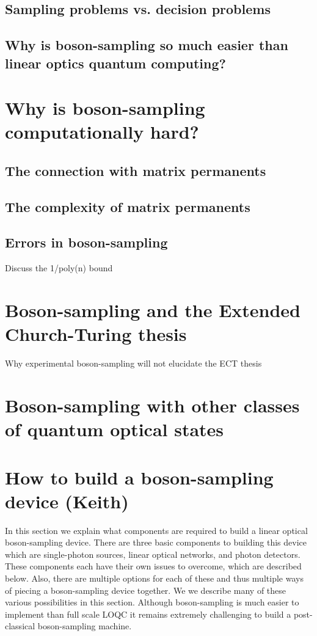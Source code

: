 \documentclass[aps,pra,twocolumn,amsmath,amssymb,nofootinbib,superscriptaddress]{revtex4}
\begin{document}
\subsection{Sampling problems vs. decision problems}

\subsection{Why is boson-sampling so much easier than linear optics quantum computing?}

\section{Why is boson-sampling computationally hard?}

\subsection{The connection with matrix permanents}

\subsection{The complexity of matrix permanents}

\subsection{Errors in boson-sampling}
Discuss the 1/poly(n) bound

\section{Boson-sampling and the Extended Church-Turing thesis}
Why experimental boson-sampling will not elucidate the ECT thesis

\section{Boson-sampling with other classes of quantum optical states}

\section{How to build a boson-sampling device (Keith)}

In this section we explain what components are required to build a linear optical boson-sampling device. There are three basic components to building this device which are single-photon sources, linear optical networks, and photon detectors. These components each have their own issues to overcome, which are described below. Also, there are multiple options for each of these and thus multiple ways of piecing a boson-sampling device together. We we describe many of these various possibilities in this section. Although boson-sampling is much easier to implement than full scale LOQC it remains extremely challenging to build a post-classical boson-sampling machine. 
\end{document}
